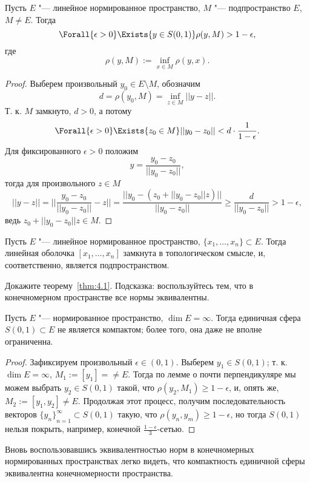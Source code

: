 \documentclass[main]{subfiles}
\begin{document}
\begin{lemma}
  Пусть \( E \) "--- линейное нормированное пространство,
  \( M \) "--- подпространство \( E \),
  \( M \ne E \).
  Тогда
  \[
    \Forall{\epsilon > 0}
    \Exists{y \in S(0, 1)}
    \rho(y, M) > 1 - \epsilon,
  \]
  где
  \[
    \rho(y, M) := \inf_{x \in M} \rho(y, x).
  \]
\end{lemma}
\begin{proof}
  Выберем произвольный \( y_0 \in E \setminus M \),
  обозначим \[ d = \rho(y_0, M) = \inf_{z \in M} ||y - z||. \]
  Т. к. \( M \) замкнуто, \( d > 0 \), а потому
  \[ \Forall{\epsilon > 0} \Exists{z_0 \in M} ||y_0 - z_0|| <
  d \cdot \frac{1}{1 - \epsilon}. \]
  Для фиксированного \( \epsilon > 0 \)
  положим
  \[ y = \frac{y_0 - z_0}{||y_0 - z_0||}, \]
  тогда для произвольного \( z \in M \)
  \[
    ||y - z|| =
    ||\frac{y_0 - z_0}{||y_0 - z_0||} - z|| =
    \frac{
      ||y_0 - (z_0 + ||y_0 - z_0|| z)||
    }{||y_0 - z_0||}
  \ge \frac{d}{||y_0 - z_0||} > 1 - \epsilon, \]
  ведь \( z_0 + ||y_0 - z_0|| z \in M \).
\end{proof}

\begin{theorem}\label{thm:4.1}
  Пусть \( E \) "--- линейное нормированное пространство,
  \( \{ x_1, \dots, x_n \} \subset E \).
  Тогда линейная оболочка \( [x_1, \dots, x_n] \) замкнута в топологическом
  смысле, и, соответственно, является подпространством.
\end{theorem}
\begin{exercise}
  Докажите теорему~\ref{thm:4.1}.
  Подсказка: воспользуйтесь тем, что в конечномерном пространстве
  все нормы эквивалентны.
\end{exercise}

\begin{theorem}[Ф. Рисс]\label{thm:sphere-compactness}
  Пусть \( E \) "--- нормированное пространство,
  \( \dim E = \infty \).
  Тогда единичная сфера \( S(0, 1) \subset E \)
  не является компактом; более того,
  она даже не вполне ограниченна.
\end{theorem}
\begin{proof}
  Зафиксируем произвольный \( \epsilon \in (0, 1) \).
  Выберем \( y_1 \in S(0, 1) \);
  т. к. \( \dim E = \infty \),
  \( M_1 := [y_1] = \ne E \).
  Тогда по лемме о почти перпендикуляре
  мы можем выбрать \( y_2 \in S(0, 1) \) такой,
  что \( \rho(y_2, M_1) \ge 1 - \epsilon \),
  и, опять же, \( M_2 := [y_1, y_2] \ne E \).
  Продолжая этот процесс, получим
  последовательность векторов
  \( {\{ y_n \}}_{n = 1}^\infty \subset S(0, 1) \)
  такую, что
  \( \rho(y_n, y_m) \ge 1 - \epsilon \),
  но тогда \( S(0, 1) \) нельзя покрыть,
  например,
  конечной \( \frac{1 - \epsilon}3 \)-сетью.
\end{proof}

\begin{remark}
  Вновь воспользовавшись эквивалентностью норм
  в конечномерных нормированных пространствах
  легко видеть, что
  компактность единичной сферы эквивалентна
  конечномерности пространства.
\end{remark}
\end{document}
